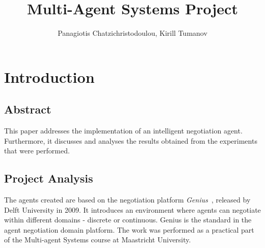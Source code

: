 \documentclass[html]{report}    %
\title{Multi-Agent Systems Project}  %
\author{Panagiotis Chatzichristodoulou, Kirill Tumanov}
\begin{document}

\maketitle                 %
\section{Introduction}
\subsection{Abstract}
This paper addresses the implementation of an intelligent negotiation agent. Furthermore, it discusses and analyses the results obtained from the experiments that were performed. 
\subsection{Project Analysis}
The agents created are based on the negotiation platform \textit{Genius}~\cite{genius}, released by Delft University in 2009. It introduces an environment where agents can negotiate within different domains - discrete or continuous. Genius is the standard in the agent negotiation domain platform. The work was performed as a practical part of the Multi-agent Systems course at Maastricht University. 
\end{document}
